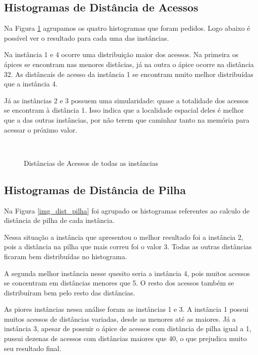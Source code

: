 \documentclass[12pt]{article}
\begin{document}
\subsection{Histogramas de Distância de Acessos}
\label{hist_dist_acess}


Na Figura \ref{img_dist_acess} agrupamos os quatro histogramas que foram pedidos. Logo abaixo é possível ver o resultado para cada uma das instâncias.

Na instância 1 e 4 ocorre uma distribuição maior dos acessos. Na primeira os ápices se encontram nas menores distâcias, já na outra o ápice ocorre na distância 32. As distâncais de acesso da instância 1 se encontram muito melhor distribuídas que a instância 4.

Já as instâncias 2 e 3 possuem uma simularidade: quase a totalidade dos acessos se encontram à distância 1. Isso indica que a localidade espacial deles é melhor que a das outras instâncias, por não terem que caminhar tanto na memória para acessar o próximo valor.

\begin{figure}
\centering
\mbox{\quad
{}}
\mbox{\quad
{}}
\caption{Distâncias de Acessos de todas as instâncias} \label{img_dist_acess}
\end{figure}


\subsection{Histogramas de Distância de Pilha}
\label{hist_dist_pilha}


Na Figura \ref{img_dist_pilha} foi agrupado os histogramas referentes ao calculo de distância de pilha de cada instância.

Nessa situação a instância que apresentou o melhor resultado foi a instância 2, pois a distância na pilha que mais correu foi o valor 3. Todas as outras distâncias ficaram bem distribuídas no histograma.

A segunda melhor instância nesse quesito seria a instância 4, pois muitos acessos se concentram em distâncias menores que 5. O resto dos acessos também se distribuíram bem pelo resto das distâncias.

As piores instâncias nessa análise foram as instâncias 1 e 3. A instãncia 1 possui muitos acessos de distâncias variadas, desde as menores até as maiores. Já a instância 3, apesar de possuir o ápice de acessos com distância de pilha igual a 1, pussui dezenas de acessos com distâncias maiores que 40, o que prejudica muito seu resultado final.
\end{document}
